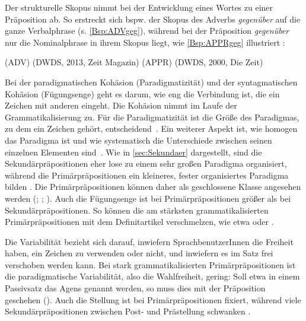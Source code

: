 Der strukturelle Skopus nimmt bei der Entwicklung eines Wortes zu einer Pr{\"a}position ab. 
So erstreckt sich bspw. der Skopus des Adverbs \textit{gegenüber }auf die ganze Verbalphrase (s. \autoref{Bsp:ADVgeg}), w{\"a}hrend bei der Pr{\"a}position \textit{gegenüber }nur die Nominalphrase in ihrem Skopus liegt, wie \autoref{Bsp:APPRgeg} illustriert \citep[s.][301]{Braunmueller1985}:
\begin{exe}
\ex {} (ADV)  (DWDS, 2013, Zeit Magazin) \label{Bsp:ADVgeg}
\ex {} (APPR)  (DWDS, 2000, Die Zeit) \label{Bsp:APPRgeg}
\end{exe}
Bei der paradigmatischen Kohäsion (Paradigmatizität) und der syntagmatischen Kohäsion (Fügungsenge) geht es darum, wie eng die Verbindung ist, die ein Zeichen mit anderen eingeht. 
Die Kohäsion nimmt im Laufe der Grammatikalisierung zu. 
F{\"u}r die Paradigmatizit{\"a}t ist die Gr{\"o}{\ss}e des Paradigmas, zu dem ein Zeichen geh{\"o}rt, entscheidend~\citep[141]{Lehmann.1995}. 
Ein weiterer Aspekt ist, wie homogen das Paradigma ist und wie systematisch die Unterschiede zwischen seinen einzelnen Elementen sind~\citep[143]{Lehmann.1995}. 
Wie in \autoref{sec:Sekundaer} dargestellt, sind die Sekundärpräpositionen eher lose zu einem sehr großen Paradigma organisiert, während die Primärpräpositionen ein kleineres, fester organisiertes Paradigma bilden \citep[s.][68]{Diewald.1997}. 
Die Primärpräpositionen können daher als geschlossene Klasse angesehen werden (\citealp[s.][66]{Diewald.1997}; \citealp[94]{Szczepaniak2011}; \citealp[353]{Helbig.2017}).
Auch die Fügungsenge ist bei Primärpräpositionen größer als bei Sekundärpräpositionen. 
So können die am stärksten grammatikalisierten Primärpräpositionen mit dem Definitartikel verschmelzen, wie etwa  oder  \citep[s.][]{Nubling2005}.

Die Variabilität bezieht sich darauf, inwiefern SprachbenutzerInnen die Freiheit haben, ein Zeichen zu verwenden oder nicht, und inwiefern es im Satz frei verschoben werden kann. 
Bei stark grammatikalisierten Primärpräpositionen ist die paradigmatische Variabilität, also die Wahlfreiheit, gering: Soll etwa in einem Passivsatz das Agens genannt werden, so muss dies mit der Präposition  geschehen (). 
Auch die Stellung ist bei Primärpräpositionen fixiert, während viele Sekundärpräpositionen zwischen Post- und Prästellung schwanken \citep[s.][29]{DiMeola2000}. 


